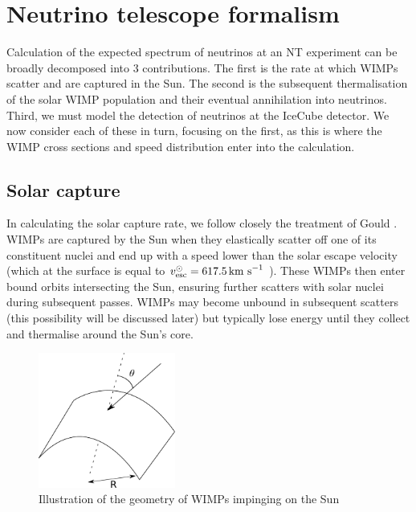 \section{Neutrino telescope formalism}
\label{sec:NT:formalism}
Calculation of the expected spectrum of neutrinos at an NT experiment can be broadly decomposed into 3 contributions. The first is the rate at which WIMPs scatter and are captured in the Sun. The second is the subsequent thermalisation of the solar WIMP population and their eventual annihilation into neutrinos. Third, we must model the detection of neutrinos at the IceCube detector. We now consider each of these in turn, focusing on the first, as this is where the WIMP cross sections and speed distribution enter into the calculation.

\subsection{Solar capture}

In calculating the solar capture rate, we follow closely the treatment of Gould \cite{Gould:1987,Gould:1992}. WIMPs are captured by the Sun when they elastically scatter off one of its constituent nuclei and end up with a speed lower than the solar escape velocity (which at the surface is equal to \(v_{\textrm{esc}}^\odot = 617.5 \,\textrm{km s}^{-1}\) \cite{Kaufmann:1991}). These WIMPs then enter bound orbits intersecting the Sun, ensuring further scatters with solar nuclei during subsequent passes. WIMPs may become unbound in subsequent scatters (this possibility will be discussed later) but typically lose energy until they collect and thermalise around the Sun's core.

\begin{figure}[h!]
    \centering
    \includegraphics[width=0.4\textwidth]{NT/Surface.pdf}
\caption[Geometry of WIMPs impinging on the Sun]{Illustration of the geometry of WIMPs impinging on the Sun}
\label{fig:NT:geometry}
\end{figure}

